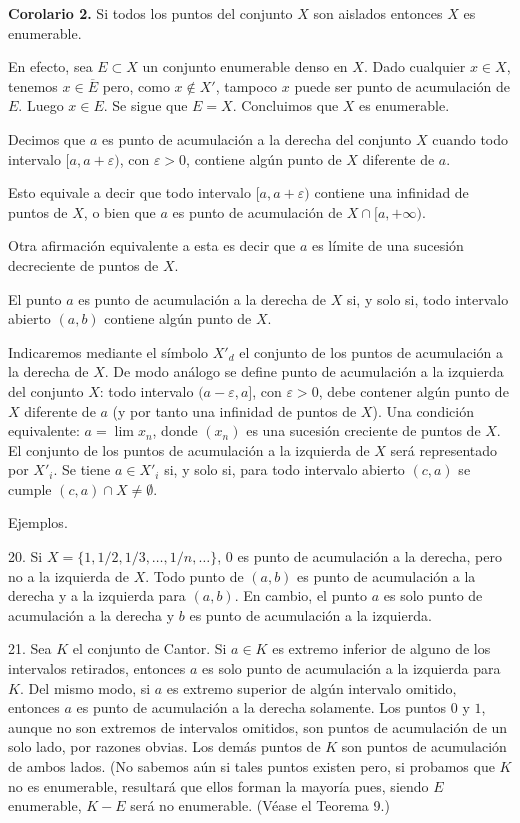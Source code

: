 \documentclass[12pt,oneside]{book}
\begin{document}
\textbf{Corolario 2.} Si todos los puntos del conjunto \(X\) son aislados entonces \(X\) es enumerable.

En efecto, sea \(E \subset X\) un conjunto enumerable denso en \(X\). Dado cualquier \(x \in X\), tenemos \(x \in \overline{E}\) pero, como \(x \notin X'\), tampoco \(x\) puede ser punto de acumulación de \(E\). Luego \(x \in E\). Se sigue que \(E = X\). Concluimos que \(X\) es enumerable.

Decimos que \(a\) es punto de acumulación a la derecha del conjunto \(X\) cuando todo intervalo \([a, a + \varepsilon)\), con \(\varepsilon > 0\), contiene algún punto de \(X\) diferente de \(a\).

Esto equivale a decir que todo intervalo \([a, a + \varepsilon)\) contiene una infinidad de puntos de \(X\), o bien que \(a\) es punto de acumulación de \(X \cap [a, +\infty)\).

Otra afirmación equivalente a esta es decir que \(a\) es límite de una sucesión decreciente de puntos de \(X\).

El punto \(a\) es punto de acumulación a la derecha de \(X\) si, y solo si, todo intervalo abierto \((a, b)\) contiene algún punto de \(X\).

Indicaremos mediante el símbolo \(X'_d\) el conjunto de los puntos de acumulación a la derecha de \(X\). De modo análogo se define punto de acumulación a la izquierda del conjunto \(X\): todo intervalo \((a - \varepsilon, a]\), con \(\varepsilon > 0\), debe contener algún punto de \(X\) diferente de \(a\) (y por tanto una infinidad de puntos de \(X\)). Una condición equivalente: \(a = \lim x_n\), donde \((x_n)\) es una sucesión creciente de puntos de \(X\). El conjunto de los puntos de acumulación a la izquierda de \(X\) será representado por \(X'_i\). Se tiene \(a \in X'_i\) si, y solo si, para todo intervalo abierto \((c, a)\) se cumple \((c, a) \cap X \neq \emptyset\).

Ejemplos.

20. Si \(X = \{1, 1/2, 1/3, \dots, 1/n, \dots\}\), \(0\) es punto de acumulación a la derecha, pero no a la izquierda de \(X\). Todo punto de \((a, b)\) es punto de acumulación a la derecha y a la izquierda para \((a, b)\). En cambio, el punto \(a\) es solo punto de acumulación a la derecha y \(b\) es punto de acumulación a la izquierda.

21. Sea \(K\) el conjunto de Cantor. Si \(a \in K\) es extremo inferior de alguno de los intervalos retirados, entonces \(a\) es solo punto de acumulación a la izquierda para \(K\). Del mismo modo, si \(a\) es extremo superior de algún intervalo omitido, entonces \(a\) es punto de acumulación a la derecha solamente. Los puntos \(0\) y \(1\), aunque no son extremos de intervalos omitidos, son puntos de acumulación de un solo lado, por razones obvias. Los demás puntos de \(K\) son puntos de acumulación de ambos lados. (No sabemos aún si tales puntos existen pero, si probamos que \(K\) no es enumerable, resultará que ellos forman la mayoría pues, siendo \(E\) enumerable, \(K - E\) será no enumerable. (Véase el Teorema 9.)
\end{document}
